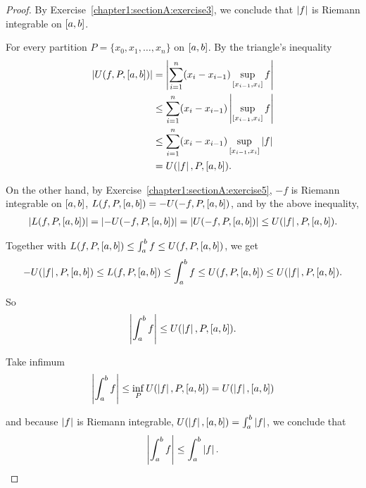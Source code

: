 \begin{proof}
    By Exercise~\ref{chapter1:sectionA:exercise3}, we conclude that $\left\vert{f}\right\vert$ is Riemann integrable on $\left[{a, b}\right]$.

    \bigskip
    For every partition $P = \{ x_{0}, x_{1}, \ldots, x_{n} \}$ on $\left[{a, b}\right]$. By the triangle's inequality
    \begin{align*}
        \left\vert{U(f, P, \left[{a, b}\right])}\right\vert & = \left\vert{\sum^{n}_{i=1}(x_{i} - x_{i-1})\sup\limits_{\left[{x_{i-1}, x_{i}}\right]}f}\right\vert    \\
                                             & \leq \sum^{n}_{i=1}(x_{i} - x_{i-1})\left\vert{\sup\limits_{\left[{x_{i-1}, x_{i}}\right]}f}\right\vert \\
                                             & \leq \sum^{n}_{i=1}(x_{i} - x_{i-1})\sup\limits_{\left[{x_{i-1},x_{i}}\right]}\left\vert{f}\right\vert  \\
                                             & = U(\left\vert{f}\right\vert, P, \left[{a, b}\right]).
    \end{align*}

    On the other hand, by Exercise~\ref{chapter1:sectionA:exercise5}, $-f$ is Riemann integrable on $\left[{a, b}\right]$, $L(f, P, \left[{a, b}\right]) = -U(-f, P, \left[{a, b}\right])$, and by the above inequality,
    \begin{align*}
        \left\vert{L(f, P, \left[{a, b}\right])}\right\vert = \left\vert{-U(-f, P, \left[{a, b}\right])}\right\vert = \left\vert{U(-f, P, \left[{a, b}\right])}\right\vert \leq U(\left\vert{f}\right\vert, P, \left[{a, b}\right]).
    \end{align*}

    Together with $L(f, P, \left[{a, b}\right]) \leq \int^{b}_{a}f \leq U(f, P, \left[{a, b}\right])$, we get
    \[
        -U(\left\vert{f}\right\vert, P, \left[{a, b}\right]) \leq L(f, P, \left[{a, b}\right]) \leq \int^{b}_{a}f \leq U(f, P, \left[{a, b}\right]) \leq U(\left\vert{f}\right\vert, P, \left[{a, b}\right]).
    \]

    So
    \[
        \left\vert{\int^{b}_{a}f}\right\vert \leq U(\left\vert{f}\right\vert, P, \left[{a, b}\right]).
    \]

    Take infimum
    \[
        \left\vert{\int^{b}_{a}f}\right\vert \leq \inf\limits_{P}U(\left\vert{f}\right\vert, P, \left[{a,b}\right]) = U(\left\vert{f}\right\vert, \left[{a, b}\right])
    \]

    and because $\left\vert{f}\right\vert$ is Riemann integrable, $U(\left\vert{f}\right\vert, \left[{a, b}\right]) = \int^{b}_{a}\left\vert{f}\right\vert$, we conclude that
    \[
        \left\vert{\int^{b}_{a}f}\right\vert \leq \int^{b}_{a}\left\vert{f}\right\vert.\qedhere
    \]
\end{proof}
\newpage

